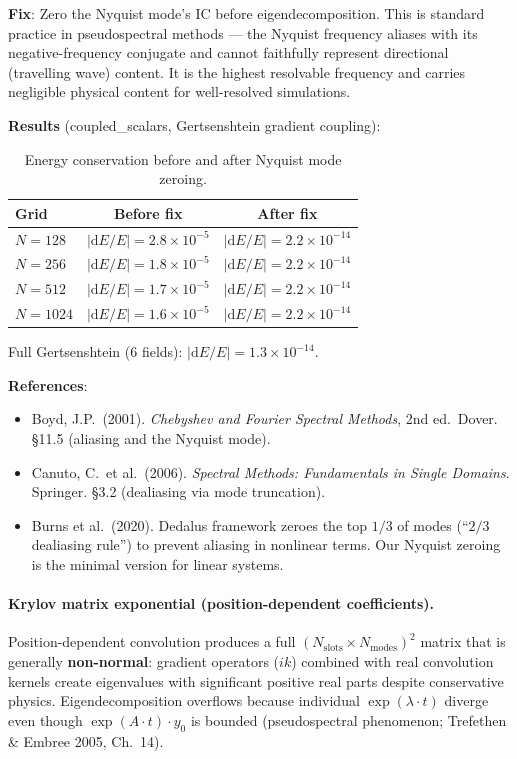 \textbf{Fix}: Zero the Nyquist mode's IC before eigendecomposition. This is standard practice in pseudospectral methods --- the Nyquist frequency aliases with its negative-frequency conjugate and cannot faithfully represent directional (travelling wave) content. It is the highest resolvable frequency and carries negligible physical content for well-resolved simulations.

\textbf{Results} (coupled\_scalars, Gertsenshtein gradient coupling):

\begin{table}[htbp]
\centering
\caption{Energy conservation before and after Nyquist mode zeroing.}
\label{tab:nyquist-fix}
\begin{tabular}{@{}lcc@{}}
\toprule
Grid & Before fix & After fix \\
\midrule
$N=128$ & $|\mathrm{d}E/E| = 2.8\times 10^{-5}$ & $|\mathrm{d}E/E| = 2.2\times 10^{-14}$ \\
$N=256$ & $|\mathrm{d}E/E| = 1.8\times 10^{-5}$ & $|\mathrm{d}E/E| = 2.2\times 10^{-14}$ \\
$N=512$ & $|\mathrm{d}E/E| = 1.7\times 10^{-5}$ & $|\mathrm{d}E/E| = 2.2\times 10^{-14}$ \\
$N=1024$ & $|\mathrm{d}E/E| = 1.6\times 10^{-5}$ & $|\mathrm{d}E/E| = 2.2\times 10^{-14}$ \\
\bottomrule
\end{tabular}
\end{table}

Full Gertsenshtein (6 fields): $|\mathrm{d}E/E| = 1.3\times 10^{-14}$.

\textbf{References}:
\begin{itemize}
  \item Boyd, J.P.\ (2001). \emph{Chebyshev and Fourier Spectral Methods}, 2nd ed.\ Dover. \S11.5 (aliasing and the Nyquist mode).
  \item Canuto, C.\ et al.\ (2006). \emph{Spectral Methods: Fundamentals in Single Domains}. Springer. \S3.2 (dealiasing via mode truncation).
  \item Burns et al.\ (2020). Dedalus framework zeroes the top $1/3$ of modes (``$2/3$ dealiasing rule'') to prevent aliasing in nonlinear terms. Our Nyquist zeroing is the minimal version for linear systems.
\end{itemize}

\paragraph{Krylov matrix exponential (position-dependent coefficients).}
\label{par:modal-krylov}
Position-dependent convolution produces a full $(N_\text{slots} \times N_\text{modes})^2$ matrix that is generally \textbf{non-normal}: gradient operators ($ik$) combined with real convolution kernels create eigenvalues with significant positive real parts despite conservative physics. Eigendecomposition overflows because individual $\exp(\lambda \cdot t)$ diverge even though $\exp(A \cdot t) \cdot y_0$ is bounded (pseudospectral phenomenon; Trefethen \& Embree 2005, Ch.\ 14).

